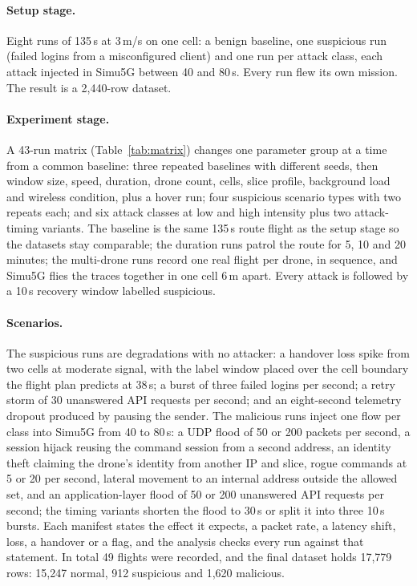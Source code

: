 \documentclass[10pt,twocolumn]{article}
\begin{document}
\paragraph{Setup stage.} Eight runs of 135\,s at 3\,m/s on one cell: a benign
baseline, one suspicious run (failed logins from a misconfigured client) and
one run per attack class, each attack injected in Simu5G between 40 and
80\,s. Every run flew its own mission. The result is a 2,440-row dataset.

\paragraph{Experiment stage.} A 43-run matrix (Table~\ref{tab:matrix})
changes one parameter group at a time from a common baseline: three repeated
baselines with different seeds, then window size, speed, duration, drone
count, cells, slice profile, background load and wireless condition, plus a
hover run; four
suspicious scenario types with two repeats each; and six attack classes at low
and high intensity plus two attack-timing variants. The baseline is the same
135\,s route flight as the setup stage so the datasets stay comparable; the
duration runs patrol the route for 5, 10 and 20 minutes; the multi-drone runs
record one real flight per drone, in sequence, and Simu5G flies the traces
together in one cell 6\,m apart. Every attack is followed by a 10\,s
recovery window labelled suspicious.

\paragraph{Scenarios.} The suspicious runs are degradations with no
attacker: a handover loss spike from two cells at moderate signal, with the
label window placed over the cell boundary the flight plan predicts at
38\,s; a burst of three failed logins per second; a retry storm of 30
unanswered API requests per second; and an eight-second telemetry dropout
produced by pausing the sender. The malicious runs inject one flow per class
into Simu5G from 40 to 80\,s: a UDP flood of 50 or 200 packets per second, a
session hijack reusing the command session from a second address, an
identity theft claiming the drone's identity from another IP and slice,
rogue commands at 5 or 20 per second, lateral movement to an internal
address outside the allowed set, and an application-layer flood of 50 or 200
unanswered API requests per second; the timing variants shorten the flood to
30\,s or split it into three 10\,s bursts. Each manifest states the effect it
expects, a packet rate, a latency shift, loss, a handover or a flag, and the
analysis checks every run against that statement. In total 49 flights were
recorded, and the final dataset holds 17,779 rows: 15,247 normal, 912
suspicious and 1,620 malicious.
\end{document}
